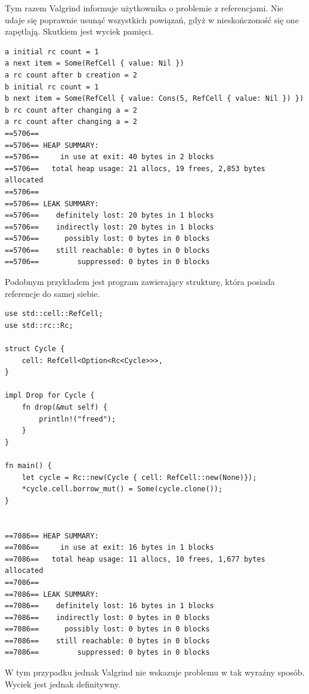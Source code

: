 \documentclass[12pt]{article}
\begin{document}
\newpage
\noindent
Tym razem Valgrind informuje użytkownika o problemie z referencjami. Nie udaje się poprawnie usunąć wszystkich powiązań, gdyż w nieskończoność się one zapętlają. Skutkiem jest wyciek pamięci. 
\begin{lstlisting}
a initial rc count = 1
a next item = Some(RefCell { value: Nil })
a rc count after b creation = 2
b initial rc count = 1
b next item = Some(RefCell { value: Cons(5, RefCell { value: Nil }) })
b rc count after changing a = 2
a rc count after changing a = 2
==5706== 
==5706== HEAP SUMMARY:
==5706==     in use at exit: 40 bytes in 2 blocks
==5706==   total heap usage: 21 allocs, 19 frees, 2,853 bytes allocated
==5706== 
==5706== LEAK SUMMARY:
==5706==    definitely lost: 20 bytes in 1 blocks
==5706==    indirectly lost: 20 bytes in 1 blocks
==5706==      possibly lost: 0 bytes in 0 blocks
==5706==    still reachable: 0 bytes in 0 blocks
==5706==         suppressed: 0 bytes in 0 blocks
\end{lstlisting}
Podobnym przykładem jest program zawierający strukturę, która posiada referencje do samej siebie.
\begin{lstlisting}
use std::cell::RefCell;
use std::rc::Rc;

struct Cycle {
    cell: RefCell<Option<Rc<Cycle>>>,
}

impl Drop for Cycle {
    fn drop(&mut self) {
        println!("freed");
    }
}

fn main() {
    let cycle = Rc::new(Cycle { cell: RefCell::new(None)});
    *cycle.cell.borrow_mut() = Some(cycle.clone());
}


==7086== HEAP SUMMARY:
==7086==     in use at exit: 16 bytes in 1 blocks
==7086==   total heap usage: 11 allocs, 10 frees, 1,677 bytes allocated
==7086== 
==7086== LEAK SUMMARY:
==7086==    definitely lost: 16 bytes in 1 blocks
==7086==    indirectly lost: 0 bytes in 0 blocks
==7086==      possibly lost: 0 bytes in 0 blocks
==7086==    still reachable: 0 bytes in 0 blocks
==7086==         suppressed: 0 bytes in 0 blocks
\end{lstlisting}
W tym przypadku jednak Valgrind nie wskazuje problemu w tak wyraźny sposób. Wyciek jest jednak definitywny.
\end{document}
